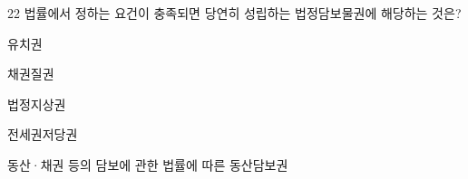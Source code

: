 \begin{question}{22}
법률에서 정하는 요건이 충족되면 당연히 성립하는 법정담보물권에 해당하는 것은?
\begin{choices}
  \item 유치권
  \item 채권질권
  \item 법정지상권
  \item 전세권저당권
  \item 동산·채권 등의 담보에 관한 법률에 따른 동산담보권
\end{choices}
\end{question}
